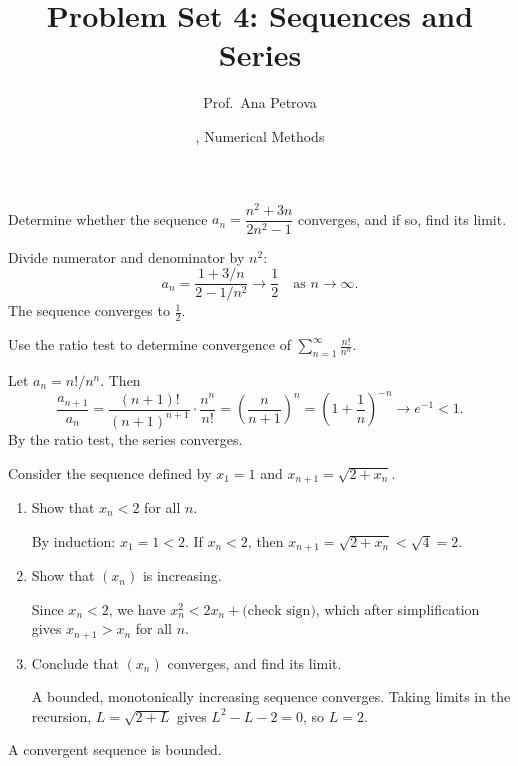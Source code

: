 \documentclass[11pt,
  title in boldface,
  theorem in new line,
  simple names,
  colored solution,
]{homework}
\title{Problem Set 4: Sequences and Series}
\author{Prof.\ Ana Petrova}
\date{\TheDate{2026-02-10}, Numerical Methods}
\begin{document}
\begin{problem}
Determine whether the sequence $a_n = \dfrac{n^2 + 3n}{2n^2 - 1}$
converges, and if so, find its limit.
\end{problem}

\begin{solution}
Divide numerator and denominator by $n^2$:
\[
  a_n = \frac{1 + 3/n}{2 - 1/n^2} \longrightarrow \frac{1}{2}
  \quad \text{as } n \to \infty.
\]
The sequence converges to $\tfrac{1}{2}$.
\end{solution}

\begin{problem}
Use the ratio test to determine convergence of
$\displaystyle\sum_{n=1}^{\infty} \frac{n!}{n^n}$.
\end{problem}

\begin{solution}[Proof]
Let $a_n = n!/n^n$. Then
\[
  \frac{a_{n+1}}{a_n}
  = \frac{(n+1)!}{(n+1)^{n+1}} \cdot \frac{n^n}{n!}
  = \left(\frac{n}{n+1}\right)^n
  = \left(1 + \frac{1}{n}\right)^{-n}
  \longrightarrow e^{-1} < 1.
\]
By the ratio test, the series converges.
\qedhere
\end{solution}

\begin{problem}
Consider the sequence defined by $x_1 = 1$ and $x_{n+1} = \sqrt{2 + x_n}$.
\begin{enumerate}
  \item Show that $x_n < 2$ for all $n$.

  \begin{solution}
  By induction: $x_1 = 1 < 2$. If $x_n < 2$, then
  $x_{n+1} = \sqrt{2 + x_n} < \sqrt{4} = 2$.
  \end{solution}

  \item Show that $(x_n)$ is increasing.

  \begin{solution}
  Since $x_n < 2$, we have $x_n^2 < 2x_n + \text{(check sign)}$, which
  after simplification gives $x_{n+1} > x_n$ for all $n$.
  \end{solution}

  \item Conclude that $(x_n)$ converges, and find its limit.

  \begin{solution}
  A bounded, monotonically increasing sequence converges. Taking
  limits in the recursion, $L = \sqrt{2 + L}$ gives $L^2 - L - 2 = 0$,
  so $L = 2$.
  \end{solution}
\end{enumerate}
\end{problem}

\begin{fact}
A convergent sequence is bounded.
\proofless
\end{fact}

\end{document}
